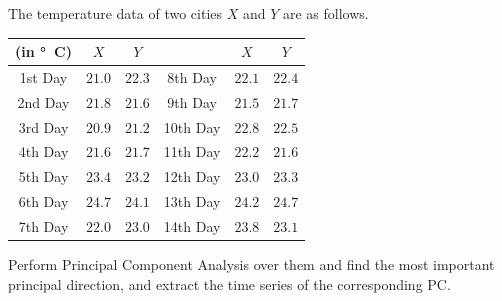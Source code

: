 \begin{exmp}
\label{exmp:tempPCA}
The temperature data of two cities $X$ and $Y$ are as follows.
\begin{center}
\begin{tabular}{|c|c|c|c|c|c|}
\hline
(in \si{\degree C}) & $X$ & $Y$ & & $X$ & $Y$ \\
\hline
1st Day & $21.0$ & $22.3$ & 8th Day & $22.1$ & $22.4$ \\
\hline
2nd Day & $21.8$ & $21.6$ & 9th Day & $21.5$ & $21.7$ \\
\hline
3rd Day & $20.9$ & $21.2$ & 10th Day & $22.8$ & $22.5$ \\
\hline
4th Day & $21.6$ & $21.7$ & 11th Day & $22.2$ & $21.6$ \\
\hline
5th Day & $23.4$ & $23.2$ & 12th Day & $23.0$ & $23.3$ \\
\hline 
6th Day & $24.7$ & $24.1$ & 13th Day & $24.2$ & $24.7$ \\
\hline 
7th Day & $22.0$ & $23.0$ & 14th Day & $23.8$ & $23.1$ \\
\hline
\end{tabular}
\end{center}
Perform Principal Component Analysis over them and find the most important principal direction, and extract the time series of the corresponding PC.
\end{exmp}
